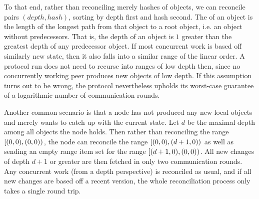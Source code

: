 To that end, rather than reconciling merely hashes of objects, we can reconcile pairs $(\mathit{depth}, \mathit{hash})$, sorting by depth first and hash second. The  of an object is the length of the longest path from that object to a root object, i.e. an object without predecessors. That is, the depth of an object is $1$ greater than the greatest depth of any predecessor object. If most concurrent work is based off similarly new state, then it also falls into a similar range of the linear order. A protocol run does not need to recurse into ranges of low depth then, since no concurrently working peer produces new objects of low depth. If this assumption turns out to be wrong, the protocol nevertheless upholds its worst-case guarantee of a logarithmic number of communication rounds.

Another common scenario is that a node has not produced any new local objects and merely wants to catch up with the current state. Let $d$ be the maximal depth among all objects the node holds. Then rather than reconciling the range $[{(0, 0)},{(0, 0)})_{}$, the node can reconcile the range $[{(0, 0)},{(d + 1, 0)})_{}$ as well as sending an empty range item set for the range $[{(d + 1, 0)},{(0, 0)})_{}$. All new changes of depth $d + 1$ or greater are then fetched in only two communication rounds. Any concurrent work (from a depth perspective) is reconciled as usual, and if all new changes are based off a recent version, the whole reconciliation process only takes a single round trip.